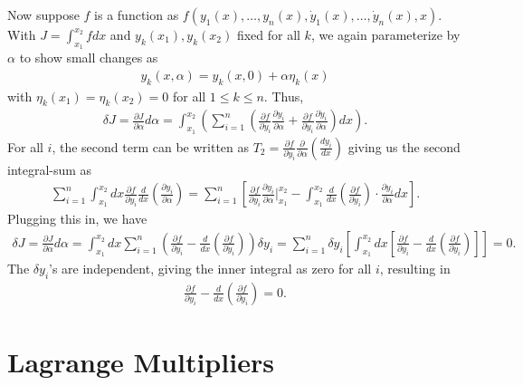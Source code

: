 Now suppose $f$ is a function as $f(y_{1}(x),\ldots,y_{n}(x),\dot{y}_{1}(x),\ldots,\dot{y}_{n}(x),x)$. With $J = \int_{x_{1}}^{x_{2}}f dx$ and $y_{k}(x_{1}), y_{k}(x_{2})$ fixed for all $k$, we again parameterize by $\alpha$ to show small changes as
\begin{align}
    y_{k}(x,\alpha) = y_{k}(x,0) + \alpha \eta_{k}(x)
\end{align}
with $\eta_{k}(x_{1}) = \eta_{k}(x_{2}) = 0$ for all $1 \leq k \leq n$. Thus,
\begin{align}
    \delta J = \frac{\partial J}{\partial \alpha} d \alpha = \int_{x_{1}}^{x_{2}} \left( \sum_{i=1}^{n} \left( \frac{\partial f}{\partial y_{i}} \frac{\partial y_{i}}{\partial \alpha} + \frac{\partial f}{\partial \dot{y}_{i}} \frac{\partial \dot{y}_{i}}{\partial \alpha} \right) dx\right).
\end{align}
For all $i$, the second term can be written as $T_{2} = \frac{\partial f}{\partial \dot{y}_{i}} \frac{\partial}{\partial \alpha} \left( \frac{dy_{i}}{dx} \right)$ giving us the second integral-sum as
\begin{align}
    \sum_{i=1}^{n} \int_{x_{1}}^{x_{2}} dx \frac{\partial f}{\partial \dot{y}_{i}} \frac{d}{dx} \left( \frac{\partial y_{i}}{\partial \alpha} \right) = \sum_{i=1}^{n} \left[ \frac{\partial f}{\partial y_{i}} \frac{\partial y_{i}}{\partial \alpha} \bigg|_{x_{1}}^{x_{2}} - \int_{x_{1}}^{x_{2}} \frac{d}{dx} \left( \frac{\partial f}{\partial \dot{y}_{i}} \right) \cdot \frac{\partial y_{i}}{\partial \alpha} dx \right].
\end{align}
Plugging this in, we have
\begin{align}
    \delta J = \frac{\partial J}{\partial \alpha} d\alpha = \int_{x_{1}}^{x_{2}} dx \sum_{i=1}^{n} \left( \frac{\partial f}{\partial y_{i}} - \frac{d}{dx} \left( \frac{\partial f}{\partial \dot{y}_{i}} \right) \right) \delta y_{i} = \sum_{i=1}^{n} \delta y_{i} \left[ \int_{x_{1}}^{x_{2}} dx \left[ \frac{\partial f}{\partial y_{i}} - \frac{d}{dx} \left( \frac{\partial f}{\partial \dot{y}_{i}} \right) \right] \right] = 0.
\end{align}
The $\delta y_{i}$'s are independent, giving the inner integral as zero for all $i$, resulting in
\begin{align}
    \frac{\partial f}{\partial y_{i}} - \frac{d}{dx} \left( \frac{\partial f}{\partial \dot{y}_{i}} \right) = 0.
\end{align}

\section{Lagrange Multipliers}

